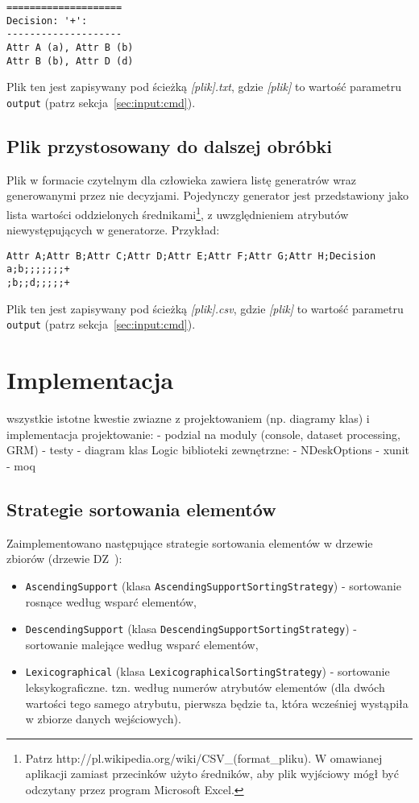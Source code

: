 \documentclass[a4paper,10pt]{article}
\begin{document}
\begin{verbatim}
====================
Decision: '+':
--------------------
Attr A (a), Attr B (b)
Attr B (b), Attr D (d)
\end{verbatim}

 Plik ten jest zapisywany pod ścieżką \emph{[plik].txt}, gdzie \emph{[plik]} to wartość parametru \verb+output+ (patrz sekcja~\ref{sec:input:cmd}).

 
 \subsection{Plik przystosowany do dalszej obróbki} \label{sec:output:csv}
 Plik w formacie czytelnym dla człowieka zawiera listę generatrów wraz generowanymi przez nie decyzjami.
 Pojedynczy generator jest przedstawiony jako lista wartości oddzielonych średnikami\footnote{Patrz http://pl.wikipedia.org/wiki/CSV\_(format\_pliku). W omawianej aplikacji zamiast przecinków użyto średników, aby plik wyjściowy mógł być odczytany przez program Microsoft Excel.}, z uwzględnieniem atrybutów niewystępujących w generatorze.
 Przykład:
 
\begin{verbatim}
Attr A;Attr B;Attr C;Attr D;Attr E;Attr F;Attr G;Attr H;Decision
a;b;;;;;;;+
;b;;d;;;;;+
\end{verbatim}
 
 Plik ten jest zapisywany pod ścieżką \emph{[plik].csv}, gdzie \emph{[plik]} to wartość parametru \verb+output+ (patrz sekcja~\ref{sec:input:cmd}).



\section{Implementacja} \label{sec:impl}
wszystkie istotne kwestie zwiazne z projektowaniem (np. diagramy klas) i implementacja
projektowanie:
- podzial na moduly (console, dataset processing, GRM)
- testy
- diagram klas Logic
biblioteki zewnętrzne:
- NDeskOptions
- xunit
- moq

 \subsection{Strategie sortowania elementów} \label{sec:impl:sort}
 Zaimplementowano następujące strategie sortowania elementów w drzewie zbiorów (drzewie DZ~\cite{grm}):
 
 \begin{itemize}
  \item \verb+AscendingSupport+ (klasa \verb+AscendingSupportSortingStrategy+) - sortowanie rosnące według wsparć elementów,
  \item \verb+DescendingSupport+ (klasa \verb+DescendingSupportSortingStrategy+) - sortowanie malejące według wsparć elementów,
  \item \verb+Lexicographical+ (klasa \verb+LexicographicalSortingStrategy+) - sortowanie leksykograficzne. tzn. według numerów atrybutów elementów (dla dwóch wartości tego samego atrybutu, pierwsza będzie ta, która wcześniej wystąpiła w zbiorze danych wejściowych).
 \end{itemize}
 
\end{document}
